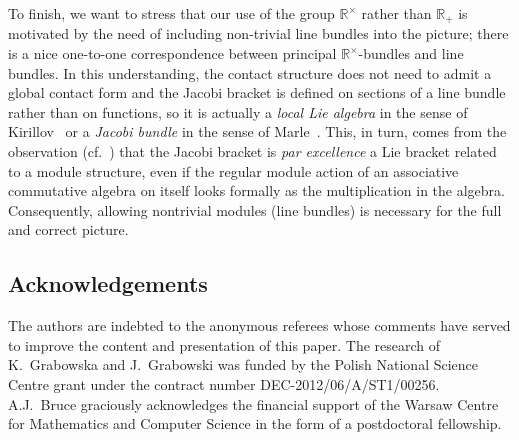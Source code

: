 \documentclass[10pt,a4paper]{amsart}
\numberwithin{equation}{section}
\begin{document}
To f\/inish, we want to stress that our use of the group ${\mathbb R}^\times$ rather than ${\mathbb R}_+$ is motivated by the need of including non-trivial line bundles into the picture; there is a nice one-to-one correspondence between principal ${\mathbb R}^\times$-bundles and line bundles. In this understanding, the contact structure does not need to admit a global contact form and the Jacobi bracket is def\/ined on sections of a line bundle rather than on functions, so it is actually a \emph{local Lie algebra} in the sense of Kirillov~\cite{Kirillov:1976} or a \emph{Jacobi bundle} in the sense of Marle~\cite{Marle:1991}. This, in turn, comes from the observation (cf.~\cite[Remark~2.4]{Grabowski2013}) that the Jacobi bracket is \emph{par excellence} a Lie bracket related to a module structure, even if the regular module action of an associative commutative algebra on itself looks formally as the multiplication in the algebra. Consequently, allowing nontrivial modules (line bundles) is necessary for the full and correct picture.


\subsection*{Acknowledgements}

The authors are indebted to the anonymous referees whose comments have served to improve the content and presentation of this paper. The research of K.~Grabowska and J.~Grabowski  was funded by the  Polish National Science Centre grant under the contract number DEC-2012/06/A/ST1/00256. A.J.~Bruce graciously acknowledges the f\/inancial support of the Warsaw Centre for Mathematics and Computer Science in the form of a postdoctoral fellowship.

\end{document}
